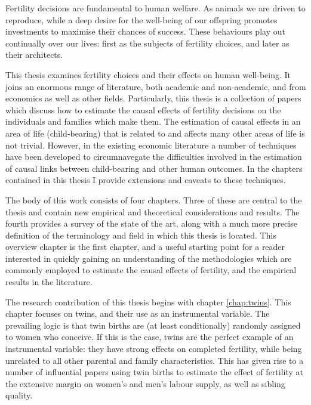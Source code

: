 Fertility decisions are fundamental to human welfare. As animals we are driven 
to reproduce, while a deep desire for the well-being of our offspring promotes 
investments to maximise their chances of success.  These behaviours play out 
continually over our lives: first as the subjects of fertility choices, and 
later as their architects.

This thesis examines fertility choices and their effects on human well-being.
It joins an enormous range of literature, both academic and non-academic, and
from economics as well as other fields.  Particularly, this thesis is a 
collection of papers which discuss how to estimate the causal effects of
fertility decisions on the individuals and families which make them.  The 
estimation of causal effects in an area of life (child-bearing) that is related 
to and affects many other areas of life is not trivial.  However, in the 
existing economic literature a number of techniques have been developed to 
circumnavegate the difficulties involved in the estimation of causal links
between child-bearing and other human outcomes.  In the chapters contained in 
this thesis I provide extensions and caveats to these techniques.

The body of this work consists of four chapters.  Three of these are central
to the thesis and contain new empirical and theoretical considerations and 
results.  The fourth provides a survey of the state of the art,
along with a much more precise definition of the terminology and field in
which this thesis is located.  This overview chapter is the first chapter,
and a useful starting point for a reader interested in quickly gaining an
understanding of the methodologies which are commonly employed to estimate the
causal effects of fertility, and the empirical results in the literature.

The research contribution of this thesis begins with chapter \ref{chap:twins}.
This chapter focuses on twins, and their use as an instrumental variable. The
prevailing logic is that twin births are (at least conditionally) randomly 
assigned to women who conceive.  If this is the case, twins are the perfect
example of an instrumental variable: they have strong effects on completed
fertility, while being unrelated to all other parental and family 
characteristics.  This has given rise to a number of influential papers using
twin births to estimate the effect of fertility at the extensive margin on
women's and men's labour supply, as well as sibling quality.

